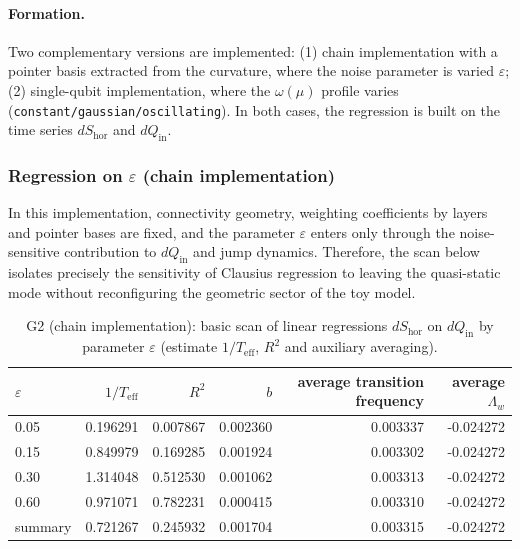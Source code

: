 \documentclass[11pt,a4paper]{article}
\theoremstyle{definition}
\theoremstyle{plain}
\theoremstyle{remark}
\begin{document}
\paragraph{Formation.}
Two complementary versions are implemented:
(1) chain implementation with a pointer basis extracted from the curvature, where the noise parameter is varied $\varepsilon$;
(2) single-qubit implementation, where the $\omega(\mu)$ profile varies (\texttt{constant/gaussian/oscillating}).
In both cases, the regression is built on the time series $dS_{\mathrm{hor}}$ and $dQ_{\mathrm{in}}$.

\subsubsection[Regression on epsilon (chain implementation)]{Regression on $\varepsilon$ (chain implementation)}
\label{sec:numerics:G2eps}

In this implementation, connectivity geometry, weighting coefficients by layers and pointer bases are fixed,
and the parameter $\varepsilon$ enters only through the noise-sensitive contribution to $dQ_{\mathrm{in}}$
and jump dynamics. Therefore, the scan below isolates precisely the sensitivity of Clausius regression
to leaving the quasi-static mode without reconfiguring the geometric sector of the toy model.

\begin{table}[t]
\centering
\caption{G2 (chain implementation): basic scan of linear regressions
$dS_{\mathrm{hor}}$ on $dQ_{\mathrm{in}}$ by parameter $\varepsilon$
(estimate $1/T_{\mathrm{eff}}$, $R^2$ and auxiliary averaging).}
\label{tab:G2eps}
\begin{tabular}{@{}lrrrrr@{}}
\toprule
$\varepsilon$ & $1/T_{\mathrm{eff}}$ & $R^2$ & $b$ & average transition frequency & average $\Lambda_w$ \\
\midrule
0.05  & 0.196291 & 0.007867 & 0.002360 & 0.003337 & -0.024272 \\
0.15  & 0.849979 & 0.169285 & 0.001924 & 0.003302 & -0.024272 \\
0.30  & 1.314048 & 0.512530 & 0.001062 & 0.003313 & -0.024272 \\
0.60  & 0.971071 & 0.782231 & 0.000415 & 0.003310 & -0.024272 \\
\midrule
summary & 0.721267 & 0.245932 & 0.001704 & 0.003315 & -0.024272 \\
\bottomrule
\end{tabular}
\end{table}
\end{document}
